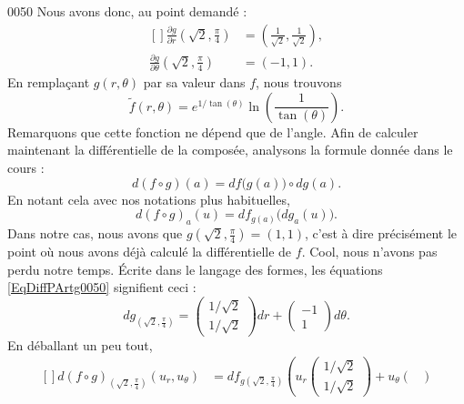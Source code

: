 \begin{corrige}{0050}
Nous avons donc, au point demandé :
\begin{equation}		\label{EqDiffPArtg0050}
	\begin{aligned}[]
		\frac{ \partial g }{ \partial r }(\sqrt{2},\frac{ \pi }{ 4 })	&=\left( \frac{1}{ \sqrt{2} },\frac{1}{ \sqrt{2} } \right),\\
		\frac{ \partial g }{ \partial \theta }(\sqrt{2},\frac{ \pi }{ 4 }) 	&=(-1,1).
	\end{aligned}
\end{equation}
En remplaçant $g(r,\theta)$ par sa valeur dans $f$, nous trouvons
\begin{equation}
	\tilde f(r,\theta)= e^{1/\tan(\theta)}\ln\left( \frac{1}{ \tan(\theta) } \right).
\end{equation}
Remarquons que cette fonction ne dépend que de l'angle. Afin de calculer maintenant la différentielle de la composée, analysons la formule donnée dans le cours :
\begin{equation}
	d(f\circ g)(a)=df\big( g(a) \big)\circ dg(a).
\end{equation}
En notant cela avec nos notations plus habituelles,
\begin{equation}
	d(f\circ g)_a(u)=df_{g(a)}\big( dg_a(u) \big).
\end{equation}
Dans notre cas, nous avons que $g(\sqrt{2},\frac{ \pi }{ 4 })=(1,1)$, c'est à dire précisément le point où nous avons déjà calculé la différentielle de $f$. Cool, nous n'avons pas perdu notre temps. Écrite dans le langage des formes, les équations \eqref{EqDiffPArtg0050} signifient ceci :
\begin{equation}
	dg_{(\sqrt{2},\frac{ \pi }{ 4 })}=\begin{pmatrix}
	1/\sqrt{2}	\\ 
	1/\sqrt{2}	
\end{pmatrix}dr+
\begin{pmatrix}
	-1	\\ 
	1	
\end{pmatrix}d\theta.
\end{equation}
En déballant un peu tout,
\begin{equation}
	\begin{aligned}[]
		d(f\circ g)_{(\sqrt{2},\frac{ \pi }{ 4 })}(u_r,u_{\theta})
					&=df_{g (\sqrt{2},\frac{ \pi }{ 4 }) }\left( 
		u_r\begin{pmatrix}
	1/\sqrt{2}	\\ 
	1/\sqrt{2}	
\end{pmatrix} +
u_{\theta}\begin{pmatrix}

\end{pmatrix}
\end{aligned}
\end{equation}
\end{corrige}
